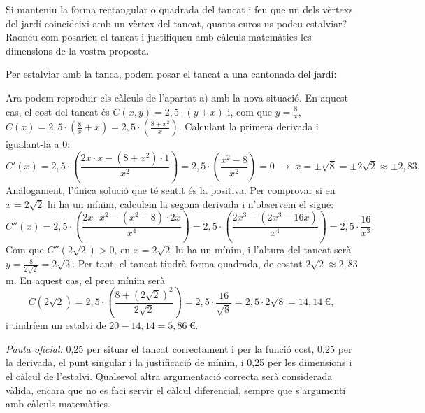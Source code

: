 \begin{apartats}
Si manteniu la forma rectangular o quadrada del tancat i feu que un dels vèrtexs del jardí coincideixi amb un vèrtex del
tancat, quants euros us podeu estalviar? Raoneu com posaríeu el tancat i justifiqueu amb càlculs matemàtics les
dimensions de la vostra proposta.

\begin{solucio}
Per estalviar amb la tanca, podem posar el tancat a una cantonada del jardí:
\begin{center}
\end{center}
Ara podem reproduir els càlculs de l'apartat a) amb la nova situació. En aquest cas, el cost del tancat és
$C(x,y)=2{,}5\cdot(y+x)$ i, com que $y=\frac8x$, $C(x)=2{,}5\cdot\left(\frac8x+x\right)=2{,}5\cdot\left(\frac{8+x^2}{x}\right)$.
Calculant la primera derivada i igualant-la a 0:
\[
C'(x)=2{,}5\cdot\left(\frac{2x\cdot x-\left(8+x^2\right)\cdot1}{x^2}\right)=2{,}5\cdot\left(\frac{x^2-8}{x^2}\right)=0
\;\rightarrow\;x=\pm\sqrt8=\pm2\sqrt2\approx\pm2{,}83 .
\]
Anàlogament, l'única solució que té sentit és la positiva. Per comprovar si en $x=2\sqrt2$ hi ha un mínim, calculem la
segona derivada i n'observem el signe:
\[
C''(x)=2{,}5\cdot\left(\frac{2x\cdot x^2-\left(x^2-8\right)\cdot2x}{x^4}\right)
=2{,}5\cdot\left(\frac{2x^3-\left(2x^3-16x\right)}{x^4}\right)=2{,}5\cdot\frac{16}{x^3}.
\]
Com que $C''\!\left(2\sqrt2\right)>0$, en $x=2\sqrt2$ hi ha un mínim, i l'altura del tancat serà
$y=\frac{8}{2\sqrt2}=2\sqrt2$. Per tant, el tancat tindrà forma quadrada, de costat $2\sqrt2\approx2{,}83$ m. En aquest cas,
el preu mínim serà
\[
C\!\left(2\sqrt2\right)=2{,}5\cdot\left(\frac{8+\left(2\sqrt2\right)^2}{2\sqrt2}\right)=2{,}5\cdot\frac{16}{\sqrt8}=2{,}5\cdot2\sqrt8=14{,}14\ \text{€},
\]
i tindríem un estalvi de $20-14{,}14=\boxed{5{,}86\ \text{€}}$.

\textit{Pauta oficial:} 0,25 per situar el tancat correctament i per la funció cost, 0,25 per la derivada, el punt
singular i la justificació de mínim, i 0,25 per les dimensions i el càlcul de l'estalvi. Qualsevol altra argumentació
correcta serà considerada vàlida, encara que no es faci servir el càlcul diferencial, sempre que s'argumenti amb càlculs
matemàtics.
\end{solucio}

\end{apartats}
